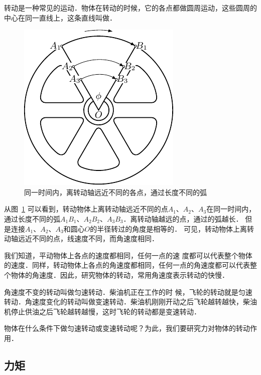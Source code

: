 转动是一种常见的运动．物体在转动的时候，它的各点都做圆周运动，这些圆周的中心在同一直线上，这条直线叫做．
\begin{figure}[htbp]
    \centering
    \includegraphics{fig/A/6-6.pdf}
    \caption{同一时间内，离转动轴远近不同的各点，通过长度不同的弧}\label{fig_A_6-6}
\end{figure}

从图~\ref{fig_A_6-6} 可以看到，转动物体上离转动轴远近不同的点$A_1$、$A_2$、$A_3$在同一时间内，通过长度不同的弧$A_1B_1$、$A_2B_2$、$A_3B_3$．离转动轴越远的点，通过的弧越长．
但是连接$A_1$、$A_2$、$A_3$和圆心$O$的半径转过的角度是相等的．
可见，转动物体上离转动轴远近不同的点，线速度不同，而角速度相同．

我们知道，平动物体上各点的速度都相同，任何一点的速
度都可以代表整个物体的速度．同样，转动物体上各点的角速度都相同，任何一点的角速度都可以代表整个物体的角速度．因此，研究物体的转动，常用角速度表示转动的快慢．

角速度不变的转动叫做匀速转动．柴油机正在工作的时
候，飞轮的转动就是匀速转动．角速度变化的转动叫做变速转动．柴油机刚刚开动之后飞轮越转越快，柴油机停止供油之后飞轮越转越慢，这时飞轮的转动都是变速转动．

物体在什么条件下做匀速转动或变速转动呢？为此，我们要研究力对物体的转动作用．



\subsection{力矩} 

